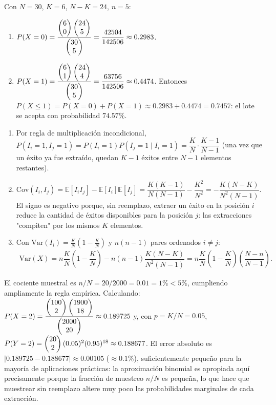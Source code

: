 \begin{solproblema}[prob:1651c98]
	Con $N=30$, $K=6$, $N-K=24$, $n=5$:
	\begin{enumerate}
		\item $P(X=0) = \dfrac{\begin{pmatrix} 6 \\ 0\end{pmatrix}\begin{pmatrix} 24 \\ 5\end{pmatrix}}{\begin{pmatrix} 30 \\ 5\end{pmatrix}} = \dfrac{42504}{142506} \approx 0.2983$.
		\item $P(X=1) = \dfrac{\begin{pmatrix} 6 \\ 1\end{pmatrix}\begin{pmatrix} 24 \\ 4\end{pmatrix}}{\begin{pmatrix} 30 \\ 5\end{pmatrix}} = \dfrac{63756}{142506} \approx 0.4474$. Entonces $P(X\le1) = P(X=0)+P(X=1) \approx 0.2983+0.4474 = 0.7457$: el lote se acepta con probabilidad $74.57\%$.
	\end{enumerate}
\end{solproblema}

\begin{solproblema}[prob:64e9a8d]
	\begin{enumerate}
		\item Por regla de multiplicación incondicional, $P(I_i=1,I_j=1) = P(I_i=1)P(I_j=1\mid I_i=1) = \dfrac{K}{N}\cdot\dfrac{K-1}{N-1}$ (una vez que un éxito ya fue extraído, quedan $K-1$ éxitos entre $N-1$ elementos restantes).
		\item $\text{Cov}(I_i,I_j) = \mathbb{E}[I_iI_j]-\mathbb{E}[I_i]\mathbb{E}[I_j] = \dfrac{K(K-1)}{N(N-1)}-\dfrac{K^2}{N^2} = -\dfrac{K(N-K)}{N^2(N-1)}$. El signo es negativo porque, sin reemplazo, extraer un éxito en la posición $i$ reduce la cantidad de éxitos disponibles para la posición $j$: las extracciones "compiten" por los mismos $K$ elementos.
		\item Con $\text{Var}(I_i)=\frac{K}{N}(1-\frac{K}{N})$ y $n(n-1)$ pares ordenados $i\neq j$:
		\begin{align*}
			\text{Var}(X) = n\dfrac{K}{N}\left(1-\dfrac{K}{N}\right) - n(n-1)\dfrac{K(N-K)}{N^2(N-1)} = n\dfrac{K}{N}\left(1-\dfrac{K}{N}\right)\left(\dfrac{N-n}{N-1}\right).
		\end{align*}
	\end{enumerate}
\end{solproblema}

\begin{solproblema}[prob:7cf587b]
	El cociente muestral es $n/N = 20/2000 = 0.01 = 1\% < 5\%$, cumpliendo ampliamente la regla empírica. Calculando: $P(X=2) = \dfrac{\begin{pmatrix} 100 \\ 2\end{pmatrix}\begin{pmatrix} 1900 \\ 18\end{pmatrix}}{\begin{pmatrix} 2000 \\ 20\end{pmatrix}} \approx 0.189725$ y, con $p=K/N=0.05$, $P(Y=2) = \begin{pmatrix} 20 \\ 2\end{pmatrix}(0.05)^2(0.95)^{18} \approx 0.188677$. El error absoluto es $|0.189725-0.188677| \approx 0.00105$ ($\approx 0.1\%$), suficientemente pequeño para la mayoría de aplicaciones prácticas: la aproximación binomial es apropiada aquí precisamente porque la fracción de muestreo $n/N$ es pequeña, lo que hace que muestrear sin reemplazo altere muy poco las probabilidades marginales de cada extracción.
\end{solproblema}

